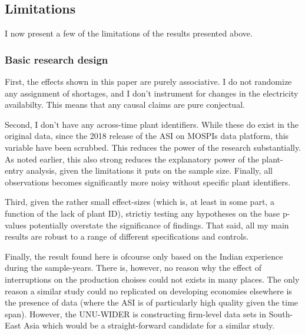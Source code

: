 \documentclass[11pt]{article}
\begin{document}
\subsection{Limitations}
\label{sec:org979560b}
I now present a few of the limitations of the results presented above. 

\subsubsection{Basic research design}
First, the effects shown in this paper are purely associative. I do not randomize any assignment of shortages, and I don't instrument for changes in the electricity availabilty. This means that any causal claims are pure conjectual.

Second, I don't have any across-time plant identifiers. While these do exist in the original data, since the 2018 release of the ASI on MOSPIs data platform, this variable have been scrubbed. This reduces the power of the research substantially. As noted earlier, this also strong reduces the explanatory power of the plant-entry analysis, given the limitations it puts on the sample size. Finally, all observations becomes significantly more noisy without specific plant identifiers. 

Third, given the rather small effect-sizes (which is, at least in some part, a function of the lack of plant ID), strictiy testing any hypotheses on the base p-values potentially overstate the significance of findings. That said, all my main results are robust to a range of different specifications and controls.

Finally, the result found here is ofcourse only based on the Indian experience during the sample-years. There is, however, no reason why the effect of interruptions on the production choises could not exists in many places. The only reason a similar study could no replicated on developing economies elsewhere is the presence of data (where the ASI is of particularly high quality given the time span). However, the UNU-WIDER is constructing firm-level data sets in South-East Asia which would be a straight-forward candidate for a similar study.
\end{document}
